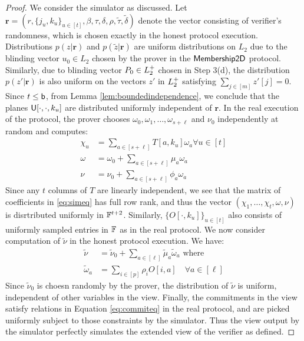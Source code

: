 \begin{proof}
We consider the simulator as discussed. Let $\bm{r}=(r,\{j_u,k_u\}_{u\in
[t]},\beta,\tau,\delta,\rho,\tilde{\tau},\tilde{\delta})$ denote the vector
consisting of verifier's randomness, which is chosen exactly in the honest
protocol execution. Distributions $p(z|\bm{r})$ and $p(\tilde{z}|\bm{r})$ are
uniform distributions on $L_2$ due to the blinding vector $u_0\in L_2$ chosen by
the prover in the $\mathsf{Membership2D}$ protocol. Similarly, due to blinding vector
$P_0\in L^{+}_2$ chosen in Step 3(d), the distribution
$p(z'|\bm{r})$ is also uniform on the vectors $z'$ in $L^{+}_2$ satisfying
$\sum_{j\in [m]}z'[j]=0$. Since $t\leq \mathsf{b}$, from Lemma
\ref{lem:boundedindependence}, we conclude that the planes
$\mathsf{U}[\cdot,\cdot,k_u]$ are distributed uniformly independent of $\bm{r}$. In
the real execution of the protocol, the prover chooses
$\omega_0,\omega_1,\ldots,\omega_{s+\ell}$ and $\nu_0$ independently at random
and computes:
\begin{align}\label{eq:simeq}
\chi_u &= \sum_{a\in [s+\ell]}T[a,k_u]\omega_a \forall u\in [t] \nonumber \\
\omega &= \omega_0 + \sum_{a\in [s+\ell]}\mu_a\omega_a \nonumber \\
\nu &= \nu_0 + \sum_{a\in [s+\ell]}\phi_a\omega_a
\end{align}    
Since any $t$ columns of $T$ are linearly independent, we see that the matrix of
coefficients in \eqref{eq:simeq} has full row rank, and thus the vector
$(\chi_1,\ldots,\chi_t,\omega,\nu)$ is disrtributed uniformly in $\mathbb{F}^{t+2}$.
Similarly, $\{O[\cdot,k_u]\}_{u\in [t]}$ also consists of uniformly sampled
entries in $\mathbb{F}$ as in the real protocol. We now consider computation of
$\tilde{\nu}$ in the honest protocol execution. We have:
\begin{align}\label{eq:simeq2}
\tilde{\nu} &= \tilde{\nu}_0 + \sum_{a\in [\ell]}\tilde{\mu}_a\tilde{\omega}_a
 \text{ where } \nonumber \\
\tilde{\omega}_a &= \sum_{i\in [p]}\rho_iO[i,a] \quad \forall a\in [\ell]
\end{align} 
Since $\tilde{\nu}_0$ is choesn randomly by the prover, the distribution of
$\tilde{\nu}$ is uniform, independent of other variables in the view. Finally,
the commitments in the view satisfy relations in Equation \ref{eq:commiteq} in
the real protocol, and are picked uniformly subject to those constraints by the
simulator. Thus the view output by the simulator perfectly simulates the
extended view of the verifier as defined. 

\end{proof}
